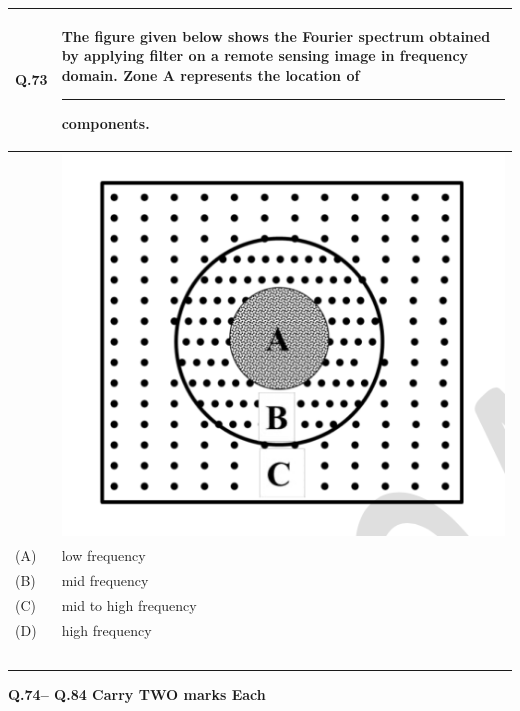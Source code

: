 \documentclass[12pt]{article}
\begin{document}
\begin{table}[H]
\renewcommand{\arraystretch}{3}
\setlength{\tabcolsep}{8pt}
\begin{tabular}{|l|p{15cm}|}
\hline

Q.73 &The figure given below shows the Fourier spectrum obtained by applying filter on
a remote sensing image in frequency domain. Zone A represents the location of
\rule{2cm}{0.15mm} components.\\ \hline
    & \includegraphics[scale = 1]{LatexImage9.png}\\ \hline
(A)&low frequency\\ \hline
(B)&mid frequency\\ \hline
(C)&mid to high frequency\\ \hline
(D)&high frequency\\ \hline
& \\ 
& \\ 
& \\ 
& \\ 
& \\ \hline

\end{tabular}
\end{table} 
\newpage

\textbf{Q.74– Q.84 Carry TWO marks Each}
\end{document}
